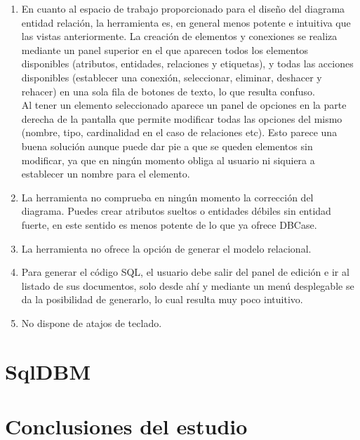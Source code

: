 \begin{enumerate}
    \item En cuanto al espacio de trabajo proporcionado para el diseño del diagrama entidad relación, la herramienta es, en general menos potente e intuitiva que las vistas anteriormente. La creación de elementos y conexiones se realiza mediante un panel superior en el que aparecen todos los elementos disponibles (atributos, entidades, relaciones y etiquetas), y todas las acciones disponibles (establecer una conexión, seleccionar, eliminar, deshacer y rehacer) en una sola fila de botones de texto, lo que resulta confuso.\\
    
    Al tener un elemento seleccionado aparece un panel de opciones en la parte derecha de la pantalla que permite modificar todas las opciones del mismo (nombre, tipo, cardinalidad en el caso de relaciones etc). Esto parece una buena solución aunque puede dar pie a que se queden elementos sin modificar, ya que en ningún momento obliga al usuario ni siquiera a establecer un nombre para el elemento.
    
    \item La herramienta no comprueba en ningún momento la corrección del diagrama. Puedes crear atributos sueltos o entidades débiles sin entidad fuerte, en este sentido es menos potente de lo que ya ofrece DBCase.\\
    
    \item La herramienta no ofrece la opción de generar el modelo relacional.
    
    \item Para generar el código SQL, el usuario debe salir del panel de edición e ir al listado de sus documentos, solo desde ahí y mediante un menú desplegable se da la posibilidad de generarlo, lo cual resulta muy poco intuitivo.
    \item No dispone de atajos de teclado.
\end{enumerate}
\section{SqlDBM}
\section{Conclusiones del estudio}